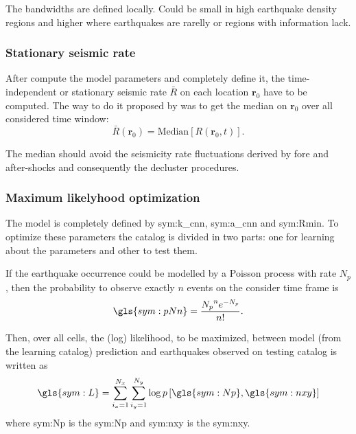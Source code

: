 \documentclass[draft, grl]{agutex}
\begin{document}
\begin{article}
The bandwidths are defined locally. Could be small in high earthquake density regions and higher where earthquakes are rarelly or regions with information lack.



\subsubsection{Stationary seismic rate}
After compute the model parameters and completely define it, the time-independent or stationary seismic rate $\bar{R}$ on each location $\boldsymbol{r}_0$ have to be computed. 
The way to do it proposed by \citet{helmstetter_2012} was to get the median
on $\boldsymbol{r}_0$ over all considered time window:
\begin{equation}
	\ensuremath{
		\bar{R}(\boldsymbol{r}_0) = \text{Median}\left[R(\boldsymbol{r}_0, t)\right].
	}
	\label{eq:stationary_rate}
\end{equation}

The median should avoid the seismicity rate fluctuations derived by fore and after-shocks and consequently the decluster procedures.


\subsubsection{Maximum likelyhood optimization}

The model is completely defined by \gls{sym:k_cnn}, \gls{sym:a_cnn} and \gls{sym:Rmin}. To optimize these parameters the catalog is divided in two parts: one for learning about the parameters and other to test them.

If the earthquake occurrence could be modelled by a Poisson process with rate $N_p$, then the probability to observe exactly $n$ events on the consider time frame is
\begin{equation}
	\ensuremath{
		\gls{sym:pNn} = \frac{{N_p}^n e^{-N_p}}{n!}.
	}
	\label{eq:poisson_probability}
\end{equation}

Then, over all cells, the (log) likelihood, to be maximized, between model (from the learning catalog) prediction and earthquakes observed on testing catalog is written as
\begin{equation}
	\ensuremath{
		\gls{sym:L} = \sum_{i_x=1}^{N_x}\sum_{i_y=1}^{N_y}\log p\left[  \gls{sym:Np}, \gls{sym:nxy}  \right]
	}
	\label{eq:loglik}
\end{equation}
where \gls{sym:Np} is the \glsdesc{sym:Np} and
	  \gls{sym:nxy} is the \glsdesc{sym:nxy}.


\end{article}
\end{document}
